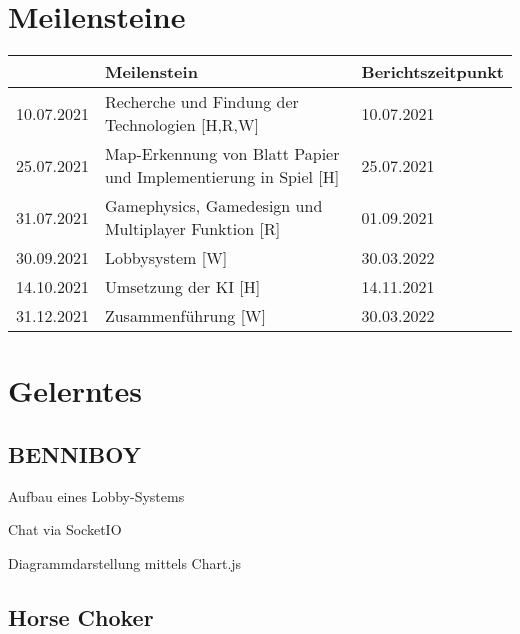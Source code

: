 \section{Meilensteine}
\begin{table}[H]
    \begin{tabular}{|l|l|l|}
    \hline
    \multicolumn{1}{|r|}{\textit{}} & \textbf{Meilenstein}                                                & \textbf{Berichtszeitpunkt} \\ \hline
    10.07.2021                      & Recherche und Findung der Technologien {[}H,R,W{]}                  & 10.07.2021                 \\ \hline
    25.07.2021                      & Map-Erkennung von Blatt Papier und Implementierung in Spiel {[}H{]} & 25.07.2021                 \\ \hline
    31.07.2021                      & Gamephysics, Gamedesign und Multiplayer Funktion {[}R{]}            & 01.09.2021                 \\ \hline
    30.09.2021                      & Lobbysystem {[}W{]}                                                 & 30.03.2022                 \\ \hline
    14.10.2021                      & Umsetzung der KI {[}H{]}                                            & 14.11.2021                 \\ \hline
    31.12.2021                      & Zusammenführung {[}W{]}                                             & 30.03.2022                 \\ \hline
    \end{tabular}
    \end{table}
\section{Gelerntes}
\subsection{BENNIBOY}
\begin{compactitem}
    \item Aufbau eines Lobby-Systems
    \item Chat via SocketIO
    \item Diagrammdarstellung mittels Chart.js
\end{compactitem}
\subsection{Horse Choker}

